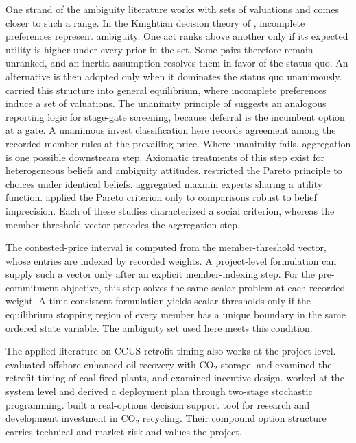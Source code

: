 One strand of the ambiguity literature works with sets of valuations and comes closer to such a range. In the Knightian decision theory of \citet{Bewley2002}, incomplete preferences represent ambiguity. One act ranks above another only if its expected utility is higher under every prior in the set. Some pairs therefore remain unranked, and an inertia assumption resolves them in favor of the status quo. An alternative is then adopted only when it dominates the status quo unanimously. \citet{RigottiShannon2005} carried this structure into general equilibrium, where incomplete preferences induce a set of valuations. The unanimity principle of \citet{Bewley2002} suggests an analogous reporting logic for stage-gate screening, because deferral is the incumbent option at a gate. A unanimous invest classification here records agreement among the recorded member rules at the prevailing price. Where unanimity fails, aggregation is one possible downstream step. Axiomatic treatments of this step exist for heterogeneous beliefs and ambiguity attitudes. \citet{Gilboa2004} restricted the Pareto principle to choices under identical beliefs. \citet{Cres2011} aggregated maxmin experts sharing a utility function. \citet{Danan2016} applied the Pareto criterion only to comparisons robust to belief imprecision. Each of these studies characterized a social criterion, whereas the member-threshold vector precedes the aggregation step.

The contested-price interval is computed from the member-threshold vector, whose entries are indexed by recorded weights. A project-level formulation can supply such a vector only after an explicit member-indexing step. For the pre-commitment objective, this step solves the same scalar problem at each recorded weight. A time-consistent formulation yields scalar thresholds only if the equilibrium stopping region of every member has a unique boundary in the same ordered state variable. The ambiguity set used here meets this condition.

The applied literature on CCUS retrofit timing also works at the project level. \citet{Compernolle2017} evaluated offshore enhanced oil recovery with CO$_2$ storage. \citet{Fan2023} and \citet{Li2026} examined the retrofit timing of coal-fired plants, and \citet{Sun2024} examined incentive design. \citet{Colombe2024} worked at the system level and derived a deployment plan through two-stage stochastic programming. \citet{Deeney2021} built a real-options decision support tool for research and development investment in CO$_2$ recycling. Their compound option structure carries technical and market risk and values the project.

